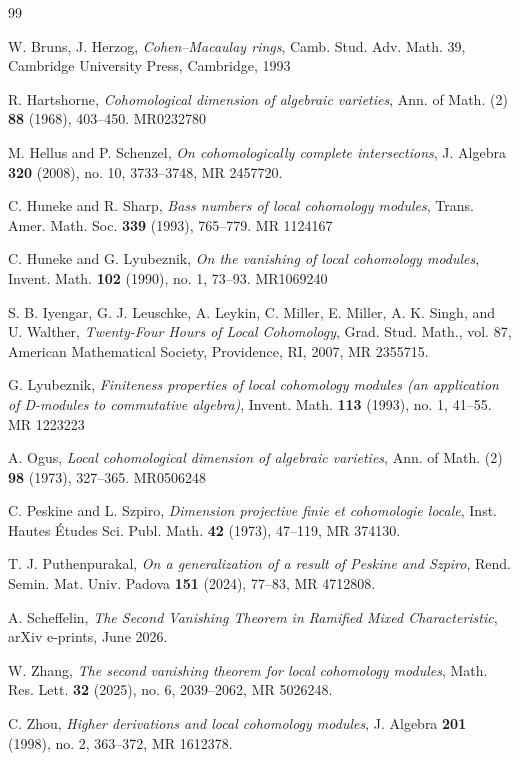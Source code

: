 \documentclass[12pt,reqno]{amsart}
\theoremstyle{definition}
\begin{document}

 \begin{thebibliography}{99}

 W. Bruns, J. Herzog, \emph{Cohen–Macaulay rings}, Camb. Stud. Adv. Math. 39, Cambridge
University Press, Cambridge, 1993

R. Hartshorne, \emph{Cohomological dimension of algebraic varieties}, Ann. of Math. (2) \textbf{88} (1968), 403–450.  MR0232780

M. Hellus and P. Schenzel, \emph{On cohomologically complete intersections}, J. Algebra \textbf{320} (2008), no. 10, 3733--3748, MR 2457720.

 C. Huneke and R. Sharp, \emph{Bass numbers of local cohomology modules}, Trans. Amer. Math. Soc. \textbf{339} (1993), 765–779. MR 1124167

C. Huneke and G. Lyubeznik, \emph{On the vanishing of local cohomology modules}, Invent. Math. \textbf{102} (1990), no. 1, 73–93.  MR1069240

S. B. Iyengar, G. J. Leuschke, A. Leykin, C. Miller, E. Miller, A. K. Singh, and U. Walther, \emph{Twenty-Four Hours of Local Cohomology}, Grad. Stud. Math., vol. 87, American Mathematical Society, Providence, RI, 2007, MR 2355715.

G. Lyubeznik, \emph{Finiteness properties of local cohomology modules (an application of D-modules to commutative algebra)}, Invent. Math. \textbf{113} (1993), no. 1, 41–55. MR 1223223

A. Ogus, \emph{Local cohomological dimension of algebraic varieties}, Ann. of Math. (2) \textbf{98} (1973), 327–365.  MR0506248


	 C. Peskine and L. Szpiro, \emph{Dimension projective finie et cohomologie locale}, Inst. Hautes \'Etudes Sci. Publ. Math. \textbf{42} (1973), 47--119, MR 374130.
     
T. J. Puthenpurakal, \emph{On a generalization of a result of Peskine and Szpiro}, Rend. Semin. Mat. Univ. Padova \textbf{151} (2024), 77--83, MR 4712808. 

A. Scheffelin, \emph{The Second Vanishing Theorem in Ramified Mixed Characteristic}, arXiv e-prints, June 2026.

W. Zhang, \emph{The second vanishing theorem for local cohomology modules}, Math. Res. Lett. \textbf{32} (2025), no. 6, 2039--2062, MR 5026248.

C. Zhou, \emph{Higher derivations and local cohomology modules}, J. Algebra \textbf{201} (1998), no. 2, 363--372, MR 1612378.
 

 \end{thebibliography}
\end{document}
